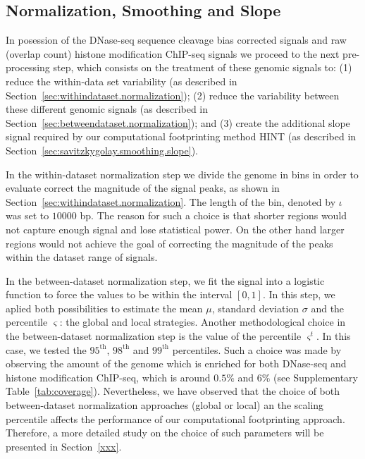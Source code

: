 \subsection{Normalization, Smoothing and Slope}
\label{sec:normalization.smoothing.slope}

In posession of the DNase-seq sequence cleavage bias corrected signals and raw (overlap count) histone modification ChIP-seq signals we proceed to the next pre-processing step, which consists on the treatment of these genomic signals to: (1) reduce the within-data set variability (as described in Section~\ref{sec:withindataset.normalization}); (2) reduce the variability between these different genomic signals (as described in Section~\ref{sec:betweendataset.normalization}); and (3) create the additional slope signal required by our computational footprinting method HINT (as described in Section~\ref{sec:savitzkygolay.smoothing.slope}).

In the within-dataset normalization step we divide the genome in bins in order to evaluate correct the magnitude of the signal peaks, as shown in Section~\ref{sec:withindataset.normalization}. The length of the bin, denoted by $\iota$ was set to $10000$ bp. The reason for such a choice is that shorter regions would not capture enough signal and lose statistical power. On the other hand larger regions would not achieve the goal of correcting the magnitude of the peaks within the dataset range of signals.

In the between-dataset normalization step, we fit the signal into a logistic function to force the values to be within the interval $[0,1]$. In this step, we aplied both possibilities to estimate the mean $\mu$, standard deviation $\sigma$ and the percentile $\varsigma$: the global and local strategies. Another methodological choice in the between-dataset normalization step is the value of the percentile ${\varsigma}^{t}$. In this case, we tested the $95^\text{th}$, $98^\text{th}$ and $99^\text{th}$ percentiles. Such a choice was made by observing the amount of the genome which is enriched for both DNase-seq and histone modification ChIP-seq, which is around $0.5\%$ and $6\%$ (see Supplementary Table~\ref{tab:coverage}). Nevertheless, we have observed that the choice of both between-dataset normalization approaches (global or local) an the scaling percentile affects the performance of our computational footprinting approach. Therefore, a more detailed study on the choice of such parameters will be presented in Section~\ref{xxx}.


